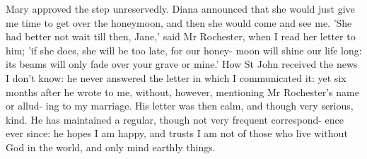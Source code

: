\documentclass[11pt,twoside]{article}\makeatletter
\begin{document}
\begin{shaded}
Mary approved the step unreservedly. Diana announced that she
would just give me time to get over the honeymoon, and then she
would come and see me.
   'She had better not wait till then, Jane,' said Mr Rochester, when I
read her letter to him; 'if she does, she will be too late, for our honey-
moon will shine our life long: its beams will only fade over your
grave or mine.'
   How St John received the news I don't know: he never answered
the letter in which I communicated it: yet six months after he wrote
to me, without, however, mentioning Mr Rochester's name or allud-
ing to my marriage. His letter was then calm, and though very serious,
kind. He has maintained a regular, though not very frequent correspond-
ence ever since: he hopes I am happy, and trusts I am not of those who
live without God in the world, and only mind earthly
things.\end{shaded}
\par\egroup 
\end{document}
